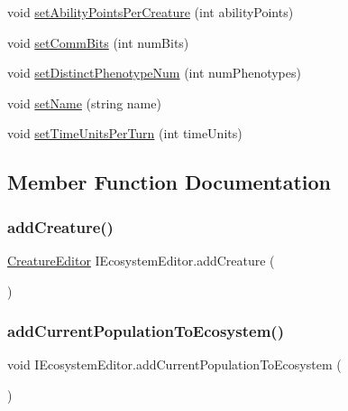 \begin{DoxyCompactItemize}
\item 
void \mbox{\hyperlink{interface_i_ecosystem_editor_ae4e824dc976d499010849d8d7d9fb730}{set\+Ability\+Points\+Per\+Creature}} (int ability\+Points)
\item 
void \mbox{\hyperlink{interface_i_ecosystem_editor_a61e02c9c45d6cff7f8d2b2760eeba1dc}{set\+Comm\+Bits}} (int num\+Bits)
\item 
void \mbox{\hyperlink{interface_i_ecosystem_editor_af81453db6f44e7276ba5467c5b582527}{set\+Distinct\+Phenotype\+Num}} (int num\+Phenotypes)
\item 
void \mbox{\hyperlink{interface_i_ecosystem_editor_a4dabd8d8fcf4acab6e2345675a33724a}{set\+Name}} (string name)
\item 
void \mbox{\hyperlink{interface_i_ecosystem_editor_ae05ed2195503dc3ee2aee5ef61116039}{set\+Time\+Units\+Per\+Turn}} (int time\+Units)
\end{DoxyCompactItemize}


\subsection{Member Function Documentation}
\mbox{\label{interface_i_ecosystem_editor_aaae20f895373be5be6f31b6f93bbfd0b}} 
\subsubsection{\texorpdfstring{add\+Creature()}{addCreature()}}
{\footnotesize\ttfamily \mbox{\hyperlink{class_creature_editor}{Creature\+Editor}} I\+Ecosystem\+Editor.\+add\+Creature (\begin{DoxyParamCaption}{ }\end{DoxyParamCaption})}

\mbox{\label{interface_i_ecosystem_editor_ab6545a2061db61dcb2d2dd05da18957e}} 
\subsubsection{\texorpdfstring{add\+Current\+Population\+To\+Ecosystem()}{addCurrentPopulationToEcosystem()}}
{\footnotesize\ttfamily void I\+Ecosystem\+Editor.\+add\+Current\+Population\+To\+Ecosystem (\begin{DoxyParamCaption}{ }\end{DoxyParamCaption})}

